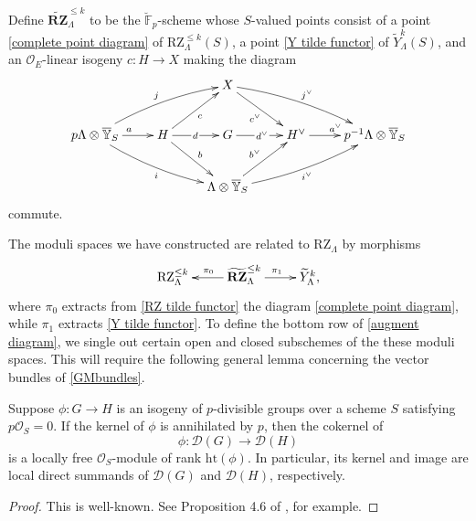 \documentclass[11pt]{alggeom}
\newcommand{\F}{\mathbb F}
\newcommand{\co}{\mathcal O}
\begin{document}
Define $\widetilde{\mathbf{RZ}}^{\le k}_\Lambda$ to be the $\breve{\F}_p$-scheme whose $S$-valued points consist of a point \eqref{complete point diagram}  of $\mathrm{RZ}^{\le k}_\Lambda(S)$, a point \eqref{Y tilde functor} of $\widetilde{Y}^k_\Lambda(S)$, and an $\co_E$-linear isogeny 
$
c : H\to X
$
making the diagram
\begin{equation}\label{RZ tilde functor}
\xymatrix{
& &   {  X  } \ar[dr]_{c^\vee}  \ar@/^/[drr]^{j^\vee} \\
{p\Lambda \otimes \overline{\mathbb{Y}}_S  }\ar[r]^a  \ar@/^/[urr]^j   \ar@/_/[drr]_i  &  { H }  \ar[ur]_c \ar[dr]^b  \ar[r]|{\, d\, }  &  {G}  \ar[r] | {\, d^\vee\, } & {H^\vee}  \ar[r]^{a^\vee}  & {p^{-1}\Lambda \otimes  \overline{\mathbb{Y}}_S  } \\
& &  { \Lambda \otimes  \overline{\mathbb{Y} }_S } \ar[ur]^{b^\vee} \ar@/_/[urr]_{i^\vee}
}
\end{equation}
commute.

The moduli spaces we have constructed are  related to $\mathrm{RZ}_\Lambda$ by morphisms
\[
\xymatrix{
{ \mathrm{RZ}_\Lambda^{\le k} }  & { \widetilde{\mathbf{RZ}}_\Lambda^{\le k} } \ar[l]_{\pi_0} \ar[r]^{\pi_1} & {  \widetilde{Y}^k_\Lambda } ,
}
\]
where $\pi_0$ extracts from \eqref{RZ tilde functor} the diagram \eqref{complete point diagram}, while 
$\pi_1$ extracts  \eqref{Y tilde functor}.
To define the bottom row of \eqref{augment diagram}, we single out certain open and closed subschemes of the these moduli spaces.  This will require the following general lemma concerning the vector bundles of \eqref{GMbundles}.



\begin{lemma}\label{lem:free crystals}
Suppose $\phi : G \to H$ is an isogeny of $p$-divisible groups over a scheme $S$ satisfying $p\co_S=0$.
If the kernel of $\phi$ is annihilated by $p$, then the  cokernel of 
\[
\phi : \mathscr{D}(G) \to \mathscr{D}(H) 
\]
is a locally free $\co_S$-module of rank $\mathrm{ht}(\phi)$.
In particular,  its kernel and image are local direct summands of $\mathscr{D}(G)$ and $\mathscr{D}(H)$, respectively.
\end{lemma}

\begin{proof}
This is well-known.  See  Proposition 4.6 of \cite{VollaardWedhorn}, for example.
\end{proof}
\end{document}
